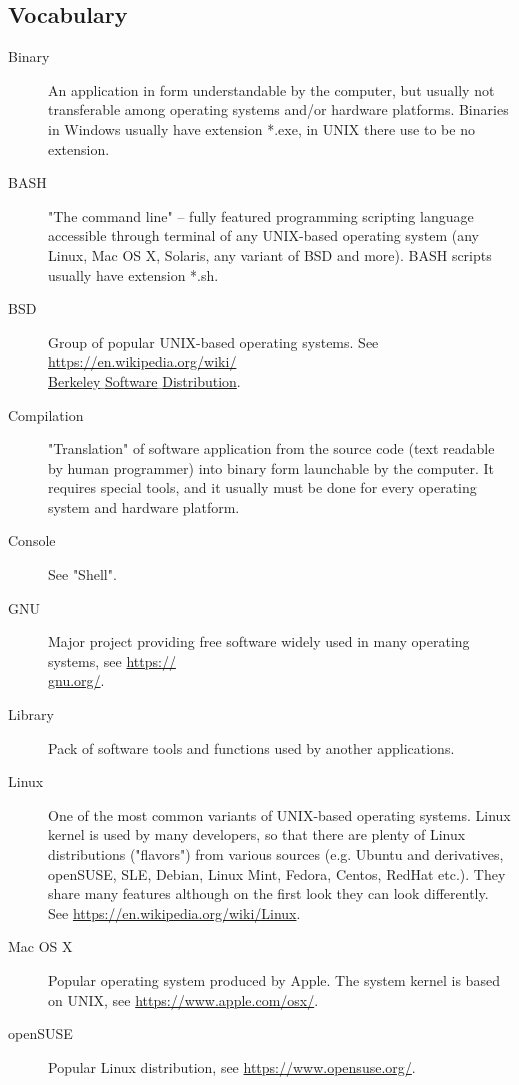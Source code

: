 \documentclass[a4paper, 11pt, twoside]{article}
\begin{document}
\subsection{Vocabulary}

\begin{description}
\item[Binary] An application in form understandable by the computer, but usually not transferable among operating systems and/or hardware platforms. Binaries in Windows usually have extension *.exe, in UNIX there use to be no extension.
\item[BASH] "The command line" -- fully featured programming scripting language accessible through terminal of any UNIX-based operating system (any Linux, Mac OS X, Solaris, any variant of BSD and more). BASH scripts usually have extension *.sh.
\item[BSD] Group of popular UNIX-based operating systems. See \href{https://en.wikipedia.org/wiki/Berkeley_Software_Distribution}{https://en.wikipedia.org/wiki/\\Berkeley$\_$Software$\_$Distribution}.
\item[Compilation] "Translation" of software application from the source code (text readable by human programmer) into binary form launchable by the computer. It requires special tools, and it usually must be done for every operating system and hardware platform.
\item[Console] See "Shell".
\item[GNU] Major project providing free software widely used in many operating systems, see \href{https://gnu.org/}{https://\\gnu.org/}.
\item[Library] Pack of software tools and functions used by another applications.
\item[Linux] One of the most common variants of UNIX-based operating systems. Linux kernel is used by many developers, so that there are plenty of Linux distributions ("flavors") from various sources (e.g. Ubuntu and derivatives, openSUSE, SLE, Debian, Linux Mint, Fedora, Centos, RedHat etc.). They share many features although on the first look they can look differently. See \href{https://en.wikipedia.org/wiki/Linux}{https://en.wikipedia.org/wiki/Linux}.
\item[Mac OS X] Popular operating system produced by Apple. The system kernel is based on UNIX, see \href{https://www.apple.com/osx/}{https://www.apple.com/osx/}.
\item[openSUSE] Popular Linux distribution, see \href{https://www.opensuse.org/}{https://www.opensuse.org/}.

\end{description}
\end{document}
